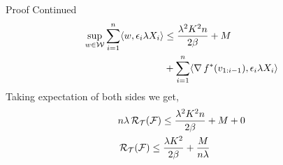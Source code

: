 \begin{frame}{Proof Continued}
    \begin{align*}
      \sup_{w \in \mathcal{W}} \sum_{i=1}^n \langle {w} , {\epsilon_i \lambda X_i} \rangle & \le \frac{\lambda^2 K^2 n}{2\beta} + M \\
      & + \sum_{i=1}^n \langle {\operatorname{\nabla}{f}^{*}(v_{1:i-1})} , {\epsilon_i \lambda X_i} \rangle
    \end{align*}
    Taking expectation of both sides we get,
    \begin{align*}
      & n\lambda\operatorname{\mathcal{R}}_{\operatorname{\mathcal{T}}}(\operatorname{\mathcal{F}}) \le \frac{\lambda^2 K^2 n}{2\beta} + M + 0\\
      & \operatorname{\mathcal{R}}_{\operatorname{\mathcal{T}}}(\operatorname{\mathcal{F}}) \le \frac{\lambda K^2}{2\beta} + \frac{M}{n\lambda}
    \end{align*}
\end{frame}
